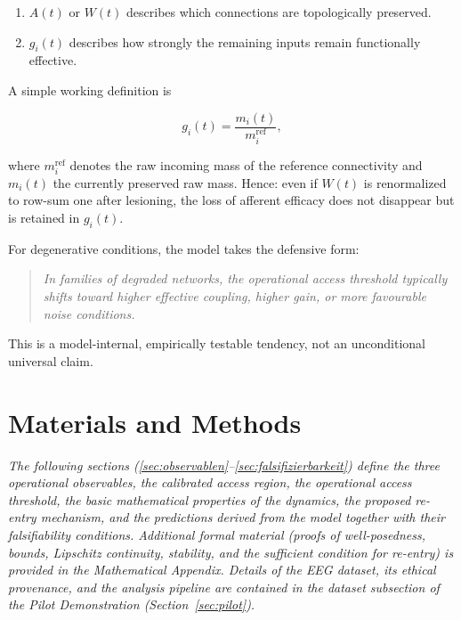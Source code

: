 ﻿\documentclass[11pt,a4paper]{article}
\theoremstyle{plain}
\theoremstyle{definition}
\theoremstyle{remark}
\begin{document}
\begin{enumerate}
  \item $A(t)$ or $W(t)$ describes which connections are topologically preserved.
  \item $g_i(t)$ describes how strongly the remaining inputs remain functionally effective.
\end{enumerate}

A simple working definition is

\begin{equation}
\label{eq:gain}
g_i(t) = \frac{m_i(t)}{m_i^{\mathrm{ref}}},
\end{equation}

where $m_i^{\mathrm{ref}}$ denotes the raw incoming mass of the reference connectivity and $m_i(t)$ the currently preserved raw mass. Hence: even if $W(t)$ is renormalized to row-sum one after lesioning, the loss of afferent efficacy does not disappear but is retained in $g_i(t)$.

For degenerative conditions, the model takes the defensive form:

\begin{quote}
\itshape
In families of degraded networks, the operational access threshold typically shifts toward higher effective coupling, higher gain, or more favourable noise conditions.
\end{quote}

This is a model-internal, empirically testable tendency, not an unconditional universal claim.


\section*{Materials and Methods}

\noindent\textit{The following sections (\ref{sec:observablen}--\ref{sec:falsifizierbarkeit}) define the three operational observables, the calibrated access region, the operational access threshold, the basic mathematical properties of the dynamics, the proposed re-entry mechanism, and the predictions derived from the model together with their falsifiability conditions. Additional formal material (proofs of well-posedness, bounds, Lipschitz continuity, stability, and the sufficient condition for re-entry) is provided in the Mathematical Appendix. Details of the EEG dataset, its ethical provenance, and the analysis pipeline are contained in the dataset subsection of the Pilot Demonstration (Section~\ref{sec:pilot}).}
\end{document}
